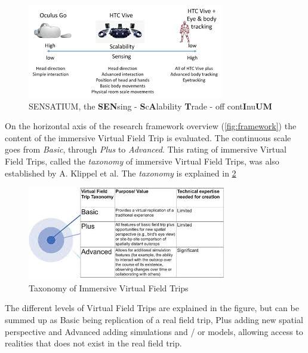         \FloatBarrier
        \begin{figure}[!ht]
            \centering
            \includegraphics[width=0.7\linewidth]{figures/framework_technology.jpg}
            \caption{SENSATIUM, the \textbf{SEN}sing - \textbf{S}c\textbf{A}lability \textbf{T}rade - off cont\textbf{I}nu\textbf{UM}}
            \label{fig:sensatium}
        \end{figure}
        \FloatBarrier
        
        On the horizontal axis of the research framework overview (\cref{fig:framework}) the content of the immersive Virtual Field Trip is evaluated. The continuous scale goes from \emph{Basic}, through \emph{Plus} to \emph{Advanced}. This rating of immersive Virtual Field Trips, called the \emph{taxonomy} of immersive Virtual Field Trips, was also established by A. Klippel et al. The \emph{taxonomy} is explained in \cref{fig:taxonomy}
        
        \FloatBarrier
        \begin{figure}[!ht]
            \centering
            \includegraphics[width=0.7\linewidth]{figures/framework_content.jpg}
            \caption{Taxonomy of Immersive Virtual Field Trips}
            \label{fig:taxonomy}
        \end{figure}
        \FloatBarrier
        
        The different levels of Virtual Field Trips are explained in the figure, but can be summed up as Basic being replication of a real field trip, Plus adding new spatial perspective and Advanced adding simulations and / or models, allowing access to realities that does not exist in the real field trip.
        
